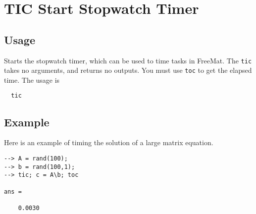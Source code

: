 \section{TIC Start Stopwatch Timer}

\subsection{Usage}

Starts the stopwatch timer, which can be used to time tasks in FreeMat.
The \verb|tic| takes no arguments, and returns no outputs.  You must use
\verb|toc| to get the elapsed time.  The usage is
\begin{verbatim}
  tic
\end{verbatim}
\subsection{Example}

Here is an example of timing the solution of a large matrix equation.
\begin{verbatim}
--> A = rand(100);
--> b = rand(100,1);
--> tic; c = A\b; toc

ans = 

    0.0030 
\end{verbatim}
